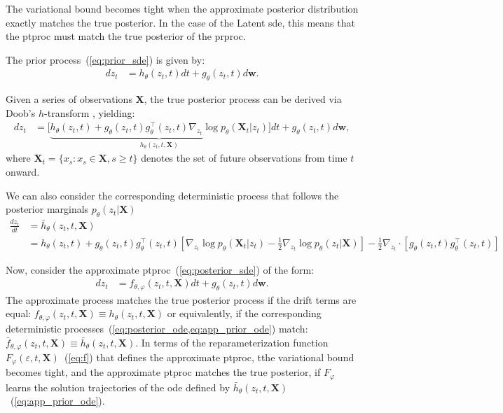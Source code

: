 \documentclass{article}
\def\X{\mathbf{X}}
\def\w{\mathbf{w}}
\def\e{\varepsilon}
\def\ph{\varphi}
\def\th{\theta}
\def\barf{\bar{f}}
\def\barh{\bar{h}}
\def\n{\nabla}
\theoremstyle{plain}
\theoremstyle{definition}
\theoremstyle{remark}
\begin{document}
The variational bound becomes tight when the approximate posterior distribution exactly matches the true posterior. In the case of the Latent \gls{sde}, this means that the \gls{ptproc} must match the true posterior of the \gls{prproc}.


The prior process~(\cref{eq:prior_sde}) is given by:
\begin{align}
    d z_t &= h_\th(z_t, t) d t + g_\th(z_t, t) d \w.
\end{align}


Given a series of observations $\X$, the true posterior process can be derived via Doob’s $h$-transform \citep{mider2021continuous,park2024amortized}, yielding:
\begin{align}
    d z_t &= \Big[ \underbrace{ h_\th(z_t, t) + g_\th(z_t, t) g^\top_\th(z_t, t) \n_{z_t} \log p_\th \left( \X_t | z_t \right) }_{h_\th(z_t, t, \X)} \Big] d t + g_\th(z_t, t) d \w,
\end{align}
where $\X_t = \{x_s : x_s \in \X, s \geq t\}$ denotes the set of future observations from time $t$ onward.


We can also consider the corresponding deterministic process that follows the posterior marginals $p_\th(z_t|\X)$
\begin{align}
    \frac{d z_t}{d t} 
    &= \barh_\th(z_t, t, \X) \\
    &= h_\th(z_t, t) + g_\th(z_t, t) g^\top_\th(z_t, t) \left[ \n_{z_t} \log p_\th \left( \X_t | z_t \right) - \frac{1}{2} \n_{z_t} \log p_\th \left( z_t | \X \right) \right] - \frac{1}{2} \n_{z_t} \cdot \left[ g_\th(z_t, t) g^\top_\th(z_t, t) \right]
    \label{eq:app_prior_ode}
\end{align}


Now, consider the approximate \gls{ptproc}~(\cref{eq:posterior_sde}) of the form:
\begin{align}
    d z_t &= f_{\th, \ph}(z_t, t, \X) d t + g_\th(z_t, t) d \w.
\end{align}
The approximate process matches the true posterior process if the drift terms are equal: $f_{\th, \ph}(z_t, t, \X) \equiv h_\th(z_t, t, \X)$ or equivalently, if the corresponding deterministic processes~(\cref{eq:posterior_ode,eq:app_prior_ode}) match: $\barf_{\th, \ph}(z_t, t, \X) \equiv \barh_\th(z_t, t, \X)$. In terms of the reparameterization function $F_\ph(\e, t, \X)$~(\cref{eq:f}) that defines the approximate \gls{ptproc}, tthe variational bound becomes tight, and the approximate \gls{ptproc} matches the true posterior, if $F_\ph$ learns the solution trajectories of the \gls{ode} defined by $\barh_\th(z_t, t, \X)$~(\cref{eq:app_prior_ode}).
\end{document}
